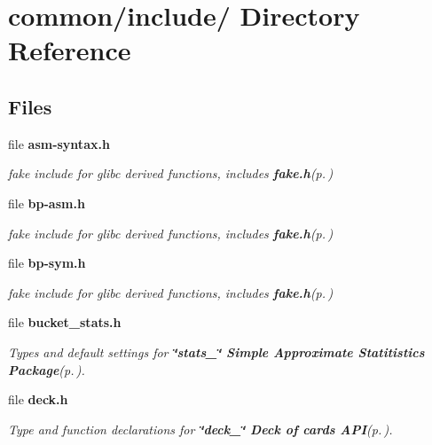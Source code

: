 \section{common/include/ Directory Reference}
\label{dir_000001}
\subsection*{Files}
\begin{CompactItemize}
\item 
file {\bf asm-syntax.h}
\begin{CompactList}\small\item\em fake include for glibc derived functions, includes {\bf fake.h}{\rm (p.\,\pageref{fake_8h})} \item\end{CompactList}

\item 
file {\bf bp-asm.h}
\begin{CompactList}\small\item\em fake include for glibc derived functions, includes {\bf fake.h}{\rm (p.\,\pageref{fake_8h})} \item\end{CompactList}

\item 
file {\bf bp-sym.h}
\begin{CompactList}\small\item\em fake include for glibc derived functions, includes {\bf fake.h}{\rm (p.\,\pageref{fake_8h})} \item\end{CompactList}

\item 
file {\bf bucket\_\-stats.h}
\begin{CompactList}\small\item\em Types and default settings for {\bf \char`\"{}stats\_\-\char`\"{} Simple Approximate Statitistics Package}{\rm (p.\,\pageref{group__stats})}. \item\end{CompactList}

\item 
file {\bf deck.h}
\begin{CompactList}\small\item\em Type and function declarations for {\bf \char`\"{}deck\_\-\char`\"{} Deck of cards API}{\rm (p.\,\pageref{group__deck})}. \item\end{CompactList}


\end{CompactItemize}
